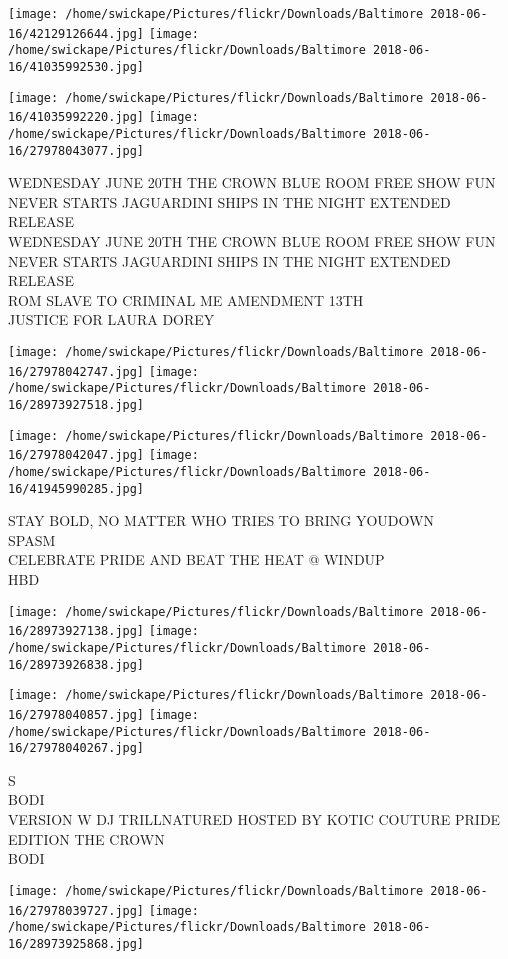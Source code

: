 \documentclass[10pt,letterpaper]{article}
\begin{document}
\texttt{[image: /home/swickape/Pictures/flickr/Downloads/Baltimore 2018-06-16/42129126644.jpg]}
\texttt{[image: /home/swickape/Pictures/flickr/Downloads/Baltimore 2018-06-16/41035992530.jpg]}

\texttt{[image: /home/swickape/Pictures/flickr/Downloads/Baltimore 2018-06-16/41035992220.jpg]}
\texttt{[image: /home/swickape/Pictures/flickr/Downloads/Baltimore 2018-06-16/27978043077.jpg]}

WEDNESDAY JUNE 20TH THE CROWN BLUE ROOM FREE SHOW FUN NEVER STARTS JAGUARDINI SHIPS IN THE NIGHT EXTENDED RELEASE\\
WEDNESDAY JUNE 20TH THE CROWN BLUE ROOM FREE SHOW FUN NEVER STARTS JAGUARDINI SHIPS IN THE NIGHT EXTENDED RELEASE\\
ROM SLAVE TO CRIMINAL ME AMENDMENT 13TH\\
JUSTICE FOR LAURA DOREY
\pagebreak

\texttt{[image: /home/swickape/Pictures/flickr/Downloads/Baltimore 2018-06-16/27978042747.jpg]}
\texttt{[image: /home/swickape/Pictures/flickr/Downloads/Baltimore 2018-06-16/28973927518.jpg]}

\texttt{[image: /home/swickape/Pictures/flickr/Downloads/Baltimore 2018-06-16/27978042047.jpg]}
\texttt{[image: /home/swickape/Pictures/flickr/Downloads/Baltimore 2018-06-16/41945990285.jpg]}

STAY BOLD, NO MATTER WHO TRIES TO BRING YOUDOWN\\
SPASM\\
CELEBRATE PRIDE AND BEAT THE HEAT @ WINDUP\\
HBD
\pagebreak

\texttt{[image: /home/swickape/Pictures/flickr/Downloads/Baltimore 2018-06-16/28973927138.jpg]}
\texttt{[image: /home/swickape/Pictures/flickr/Downloads/Baltimore 2018-06-16/28973926838.jpg]}

\texttt{[image: /home/swickape/Pictures/flickr/Downloads/Baltimore 2018-06-16/27978040857.jpg]}
\texttt{[image: /home/swickape/Pictures/flickr/Downloads/Baltimore 2018-06-16/27978040267.jpg]}

S\\
BODI\\
VERSION W DJ TRILLNATURED HOSTED BY KOTIC COUTURE PRIDE EDITION THE CROWN\\
BODI
\pagebreak

\texttt{[image: /home/swickape/Pictures/flickr/Downloads/Baltimore 2018-06-16/27978039727.jpg]}
\texttt{[image: /home/swickape/Pictures/flickr/Downloads/Baltimore 2018-06-16/28973925868.jpg]}
\end{document}
